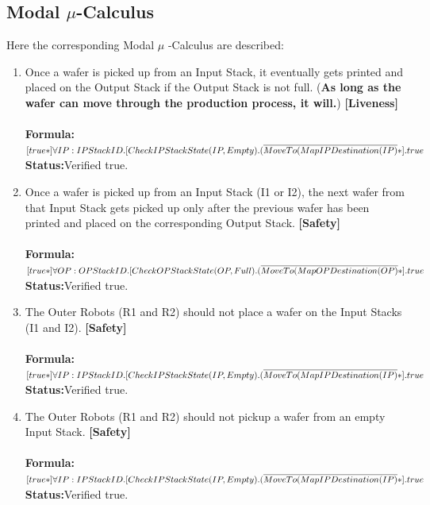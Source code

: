 \documentclass[a4paper,12pt]{article}
\begin{document}
\subsection{Modal $\mu$-Calculus}
Here the corresponding Modal $\mu$ -Calculus are described:
\begin{enumerate}
\item Once a wafer is picked up from an Input Stack, it eventually gets printed and placed on the Output Stack if the Output Stack is not full. (\textbf{As long as the wafer can move through the production process, it will.}) \textbf{[Liveness]}
\\
\\\textbf{Formula:} $[true*] \forall IP: IPStackID.[CheckIPStackState(IP, Empty).
\\(\overline{MoveTo(MapIPDestination(IP)}*].true$ \\\textbf{Status:}Verified true.

\item Once a wafer is picked up from an Input Stack (I1 or I2), the next wafer from that Input Stack gets picked up only after the previous wafer has been printed and placed on the corresponding Output Stack. \textbf{[Safety]}
\\
\\\textbf{Formula:} $[true*] \forall OP: OPStackID.[CheckOPStackState(OP, Full).
\\(\overline{MoveTo(MapOPDestination(OP)}*].true$ \\\textbf{Status:}Verified true.

\item The Outer Robots (R1 and R2) should not place a wafer on the Input Stacks (I1 and I2). \textbf{[Safety]}
\\
\\\textbf{Formula:} $[true*] \forall IP: IPStackID.[CheckIPStackState(IP, Empty).
\\(\overline{MoveTo(MapIPDestination(IP)}*].true$ \\\textbf{Status:}Verified true.

\item The Outer Robots (R1 and R2) should not pickup a wafer from an empty Input Stack. \textbf{[Safety]}
\\
\\\textbf{Formula:} $[true*] \forall IP: IPStackID.[CheckIPStackState(IP, Empty).
\\(\overline{MoveTo(MapIPDestination(IP)}*].true$ \\\textbf{Status:}Verified true.


\end{enumerate}
\end{document}
